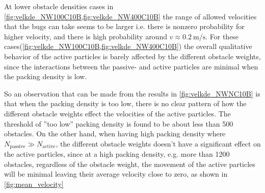 
At lower obstacle densities cases in \cref{fig:velkde_NW100C10B,fig:velkde_NW400C10B} the range of allowed 
velocities that the bugs can take seems to be larger i.e. there is nonzero probability for higher velocity, 
and there is high probability around $v\approx\SI{0.2}{\metre\per\second}$. 
For these cases(\cref{fig:velkde_NW100C10B,fig:velkde_NW400C10B}) the overall qualitative behavior of the active 
particles is barely affected by the different obstacle weights, since the interactions between 
the passive- and active particles are minimal when the packing density is low. 

So an observation that can be made from the results in \cref{fig:velkde_NWNC10B} is that when the packing density 
is too low, there is no clear pattern of how the different obstacle weights effect the velocities of the 
active particles. The threshold of ''too low'' packing density is found to be about less than \num{500} obstacles. 
On the other hand, when having high packing density where $N_{\text{passive}}\gg N_{\text{active}}$, the different obstacle weights doesn't have a 
significant effect on the active particles, since at a high packing density, e.g. more than \num{1200} obstacles, 
regardless of the obstacle weight, the movement of the active particles will be minimal leaving their 
average velocity close to zero, as shown in \cref{fig:mean_velocity}


